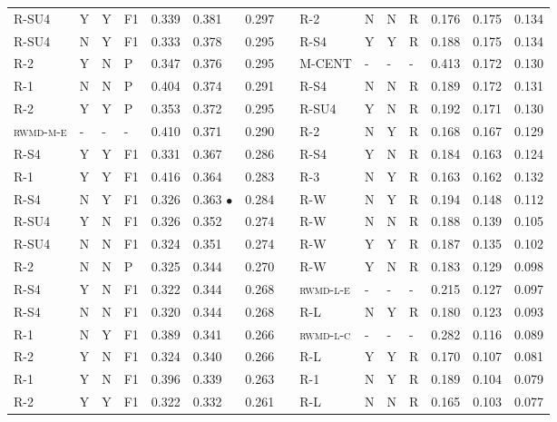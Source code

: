 \documentclass[11pt,a4paper]{article}
\begin{document}
\begin{table}[]
{\begin{tabular}{lllllllllllllll}
\textsc{R-SU4} & Y & Y & F1 & 0.339 & 0.381 & 0.297 &  & \textsc{R-2} & N & N & R & 0.176 & 0.175 & 0.134 \\
\textsc{R-SU4} & N & Y & F1 & 0.333 & 0.378 & 0.295 &  & \textsc{R-S4} & Y & Y & R & 0.188 & 0.175 & 0.134 \\
\textsc{R-2} & Y & N & P & 0.347 & 0.376 & 0.295 &  & \textsc{M-CENT} & - & - & - & 0.413 & 0.172 & 0.130 \\
\textsc{R-1} & N & N & P & 0.404 & 0.374 & 0.291 &  & \textsc{R-S4} & N & N & R & 0.189 & 0.172 & 0.131 \\
\textsc{R-2} & Y & Y & P & 0.353 & 0.372 & 0.295 &  & \textsc{R-SU4} & Y & N & R & 0.192 & 0.171 & 0.130 \\
\textsc{rwmd-m-e} & - & - & - & 0.410 & 0.371 & 0.290 &  & \textsc{R-2} & N & Y & R & 0.168 & 0.167 & 0.129 \\
\textsc{R-S4} & Y & Y & F1 & 0.331 & 0.367 & 0.286 &  & \textsc{R-S4} & Y & N & R & 0.184 & 0.163 & 0.124 \\
\textsc{R-1} & Y & Y & F1 & 0.416 & 0.364 & 0.283 &  & \textsc{R-3} & N & Y & R & 0.163 & 0.162 & 0.132 \\
\textsc{R-S4} & N & Y & F1 & 0.326 & 0.363 $\bullet$ & 0.284 &  & \textsc{R-W} & N & Y & R & 0.194 & 0.148 & 0.112 \\
\textsc{R-SU4} & Y & N & F1 & 0.326 & 0.352 & 0.274 &  & \textsc{R-W} & N & N & R & 0.188 & 0.139 & 0.105 \\
\textsc{R-SU4} & N & N & F1 & 0.324 & 0.351 & 0.274 &  & \textsc{R-W} & Y & Y & R & 0.187 & 0.135 & 0.102 \\
\textsc{R-2} & N & N & P & 0.325 & 0.344 & 0.270 &  & \textsc{R-W} & Y & N & R & 0.183 & 0.129 & 0.098 \\
\textsc{R-S4} & Y & N & F1 & 0.322 & 0.344 & 0.268 &  & \textsc{rwmd-l-e} & - & - & - & 0.215 & 0.127 & 0.097 \\
\textsc{R-S4} & N & N & F1 & 0.320 & 0.344 & 0.268 &  & \textsc{R-L} & N & Y & R & 0.180 & 0.123 & 0.093 \\
\textsc{R-1} & N & Y & F1 & 0.389 & 0.341 & 0.266 &  & \textsc{rwmd-l-c} & - & - & - & 0.282 & 0.116 & 0.089 \\
\textsc{R-2} & Y & N & F1 & 0.324 & 0.340 & 0.266 &  & \textsc{R-L} & Y & Y & R & 0.170 & 0.107 & 0.081 \\
\textsc{R-1} & Y & N & F1 & 0.396 & 0.339 & 0.263 &  & \textsc{R-1} & N & Y & R & 0.189 & 0.104 & 0.079 \\
\textsc{R-2} & Y & Y & F1 & 0.322 & 0.332 & 0.261 &  & \textsc{R-L} & N & N & R & 0.165 & 0.103 & 0.077 \\

\end{tabular}}
\end{table}
\end{document}
